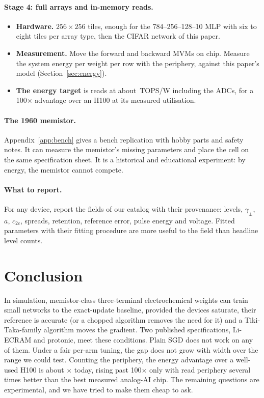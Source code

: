 \paragraph{Stage 4: full arrays and in-memory reads.}
\begin{itemize}
\item \textbf{Hardware.} $256\times256$ tiles, enough for the 784--256--128--10 MLP with six to eight tiles per array type,
      then the CIFAR network of this paper.
\item \textbf{Measurement.} Move the forward and backward MVMs on chip. Measure the system energy per weight per row with the
      periphery, against this paper's model (Section~\ref{sec:energy}).
\item \textbf{The energy target} is reads at about \REnNeedTops\,TOPS/W including the ADCs, for a 100$\times$ advantage over an
      H100 at its measured utilisation.
\end{itemize}

\paragraph{The 1960 memistor.} Appendix~\ref{app:bench} gives a bench replication with hobby parts and safety notes. It can
measure the memistor's missing parameters and place the cell on the same specification sheet. It is a historical and
educational experiment: by energy, the memistor cannot compete.

\paragraph{What to report.} For any device, report the fields of our catalog with their provenance: levels, $\gamma_\pm$, $a$,
$c_{2c}$, spreads, retention, reference error, pulse energy and voltage. Fitted parameters with their fitting procedure are
more useful to the field than headline level counts.

\section{Conclusion}
In simulation, memistor-class three-terminal electrochemical weights can train small networks to the exact-update baseline,
provided the devices saturate, their reference is accurate (or a chopped algorithm removes the need for it) and a Tiki-Taka-family
algorithm moves the gradient. Two published specifications, Li-ECRAM and protonic, meet these conditions. Plain SGD does not
work on any of them. Under a fair per-arm tuning, the gap does not grow with width over the range we could test. Counting the
periphery, the energy advantage over a well-used H100 is about \REnRatioMin$\times$ today, rising past 100$\times$ only with read
periphery several times better than the best measured analog-AI chip. The remaining questions are experimental, and we have tried
to make them cheap to ask.
